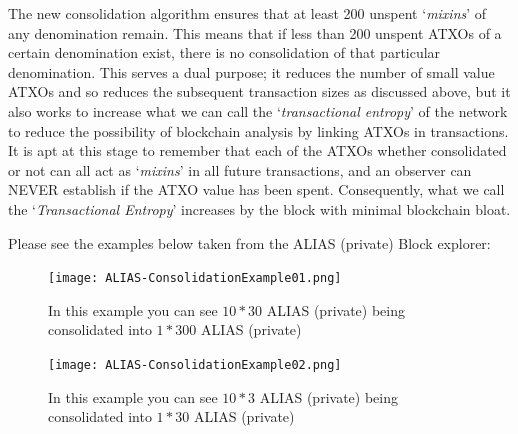 \noindent
The new consolidation algorithm ensures that at least 200 unspent
‘\textit{mixins}’ of any denomination remain. This means that if less
than 200 unspent ATXOs of a certain denomination exist, there is no
consolidation of that particular denomination. This serves a dual purpose;
it reduces the number of small value ATXOs and so reduces the subsequent
transaction sizes as discussed above, but it also works to increase what
we can call the ‘\textit{transactional entropy}’ of the network to reduce
the possibility of blockchain analysis by linking ATXOs in transactions.
It is apt at this stage to remember that each of the ATXOs whether
consolidated or not can all act as ‘\textit{mixins}’ in all future
transactions, and an observer can NEVER establish if the ATXO value has
been spent. Consequently, what we call the ‘\textit{Transactional Entropy}’
increases by the block with minimal blockchain bloat.
\newpage


\noindent
Please see the examples below taken from the ALIAS (private) Block explorer:



\begin{figure}[ht]
	\centering
	\texttt{[image: ALIAS-ConsolidationExample01.png]}
	\caption{In this example you can see $10 * 30$ ALIAS (private) being consolidated 
	into $1 * 300$ ALIAS (private)}
\end{figure}
\begin{figure}[ht]
	\centering
	\texttt{[image: ALIAS-ConsolidationExample02.png]}
	\caption{In this example you can see $10 * 3$ ALIAS (private) being consolidated 
	into $1 * 30$ ALIAS (private)}
\end{figure}



